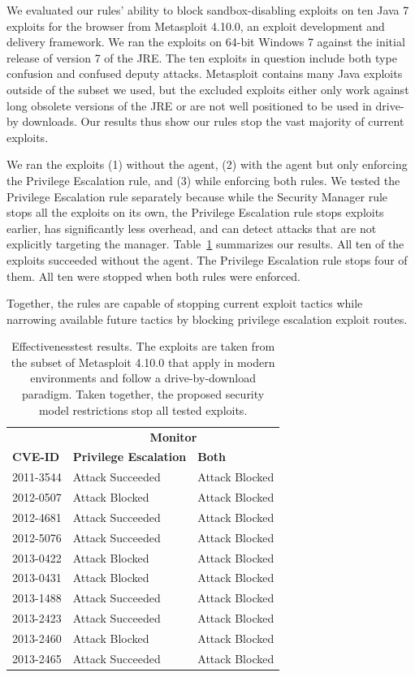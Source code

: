 \documentclass{sig-alternate-05-2015}
\begin{document}
We evaluated our rules' ability to block sandbox-disabling exploits on ten
Java 7 exploits for the browser from Metasploit 4.10.0, an exploit development
and delivery framework.  We ran the exploits on 64-bit Windows 7 against the initial release of
version 7 of the JRE.  The ten exploits in question include both type confusion and confused
deputy attacks.
Metasploit contains many Java exploits outside of the 
subset we used, but the excluded exploits either only work against long obsolete
versions of the JRE or are not well positioned to be used in drive-by
downloads.  Our results thus show our rules stop the vast majority of 
current exploits.

We ran the exploits
(1) without the agent, (2) with the agent but only enforcing the Privilege
Escalation rule, and (3) while enforcing both rules.
We tested the Privilege
Escalation rule separately because while the Security Manager rule
stops all the exploits on its own, the Privilege Escalation rule 
stops exploits earlier,
has significantly less overhead, and can detect attacks that are
not explicitly targeting the manager.
 Table~\ref{tab:Exploit-experiment-summary} 
summarizes our results.  All  
ten of the exploits succeeded without the agent. The Privilege Escalation rule
stops four of them.  All ten were stopped
when both rules were enforced. 

Together, the rules are capable of stopping current exploit tactics while
narrowing available future tactics by blocking privilege escalation exploit
routes.

\begin{table}
\caption{Effectiveness\label{tab:Exploit-experiment-summary} test results.  The
  exploits are taken from the subset of Metasploit 4.10.0 that apply in modern
  environments and follow a drive-by-download paradigm.
  Taken together, the proposed security model restrictions stop all tested exploits.}
\begin{tabular}{lll}
\toprule 
                & \multicolumn{2}{c}{\textbf{Monitor}} \\
\textbf{CVE-ID} & \textbf{Privilege Escalation} & \textbf{Both}\tabularnewline
\midrule
2011-3544 & Attack Succeeded  & Attack Blocked \\
2012-0507 & Attack Blocked & Attack Blocked \\
2012-4681 & Attack Succeeded  & Attack Blocked \\
2012-5076 & Attack Succeeded  & Attack Blocked \\
2013-0422 & Attack Blocked & Attack Blocked \\
2013-0431 & Attack Blocked & Attack Blocked \\
2013-1488 & Attack Succeeded  & Attack Blocked \\
2013-2423 & Attack Succeeded  & Attack Blocked \\
2013-2460 & Attack Blocked & Attack Blocked \\
2013-2465 & Attack Succeeded  & Attack Blocked \\
\bottomrule
\end{tabular}
\vspace{-4ex}
\end{table}
\end{document}
